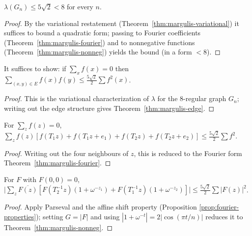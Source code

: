 \begin{theorem}
  \label{thm:margulis-expander}
  $\lambda(G_n)\le5\sqrt2<8$ for every $n$.
\end{theorem}
\begin{proof}
  By the variational restatement (Theorem~\ref{thm:margulis-variational}) it
  suffices to bound a quadratic form; passing to Fourier coefficients
  (Theorem~\ref{thm:margulis-fourier}) and to nonnegative functions
  (Theorem~\ref{thm:margulis-nonneg}) yields the bound (in a form $<8$).
\end{proof}

\begin{theorem}
  \label{thm:margulis-variational}
  It suffices to show: if $\sum_xf(x)=0$ then
  $\sum_{(x,y)\in E}f(x)f(y)\le\tfrac{5\sqrt2}2\sum f^2(x)$.
\end{theorem}
\begin{proof}
  This is the variational characterization of $\lambda$ for the $8$-regular
  graph $G_n$; writing out the edge structure gives
  Theorem~\ref{thm:margulis-edge}.
\end{proof}

\begin{theorem}
  \label{thm:margulis-edge}
  For $\sum_zf(z)=0$,
  $\sum_zf(z)[f(T_1z)+f(T_1z+e_1)+f(T_2z)+f(T_2z+e_2)]\le\tfrac{5\sqrt2}2\sum f^2$.
\end{theorem}
\begin{proof}
  Writing out the four neighbours of $z$, this is reduced to the Fourier form
  Theorem~\ref{thm:margulis-fourier}.
\end{proof}

\begin{theorem}
  \label{thm:margulis-fourier}
  For $F$ with $F(0,0)=0$,
  $\bigl|\sum_z\overline{F(z)}[F(T_2^{-1}z)(1+\omega^{-z_1})+F(T_1^{-1}z)(1+\omega^{-z_2})]\bigr|
  \le\tfrac{5\sqrt2}2\sum|F(z)|^2$.
\end{theorem}
\begin{proof}
  Apply Parseval and the affine shift property (Proposition
  \ref{prop:fourier-properties}); setting $G=|F|$ and using
  $|1+\omega^{-t}|=2|\cos(\pi t/n)|$ reduces it to
  Theorem~\ref{thm:margulis-nonneg}.
\end{proof}

